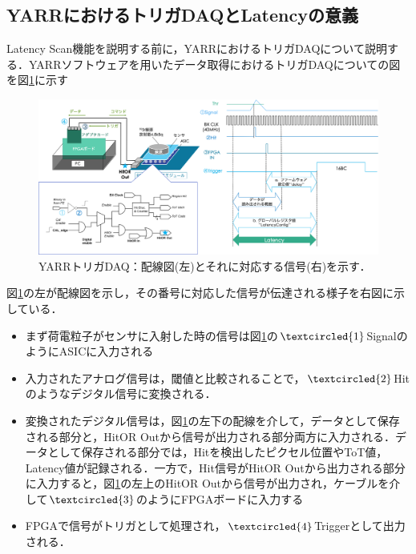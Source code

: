 \subsection{YARRにおけるトリガDAQとLatencyの意義}
Latency Scan機能を説明する前に，YARRにおけるトリガDAQについて説明する．YARRソフトウェアを用いたデータ取得におけるトリガDAQについての図を図\ref{fig:YARRDAQ}に示す\par
\begin{figure}[h]
  \centering
  \includegraphics[width=16cm]{./figure/DAQ_sigfig.png}
  \caption{YARRトリガDAQ：配線図(左)とそれに対応する信号(右)を示す．}
  \label{fig:YARRDAQ}
\end{figure}

図\ref{fig:YARRDAQ}の左が配線図を示し，その番号に対応した信号が伝達される様子を右図に示している．\par
\begin{itemize}  
\item まず荷電粒子がセンサに入射した時の信号は図\ref{fig:YARRDAQ}の$\textcircled{\scriptsize1}$SignalのようにASICに入力される
\item 入力されたアナログ信号は，閾値と比較されることで，$ \textcircled{\scriptsize2} $Hitのようなデジタル信号に変換される．
\item 変換されたデジタル信号は，図\ref{fig:YARRDAQ}の左下の配線を介して，データとして保存される部分と，HitOR Outから信号が出力される部分両方に入力される．データとして保存される部分では，Hitを検出したピクセル位置やToT値，Latency値が記録される．一方で，Hit信号がHitOR Outから出力される部分に入力すると，図\ref{fig:YARRDAQ}の左上のHitOR Outから信号が出力され，ケーブルを介して$ \textcircled{\scriptsize3} $のようにFPGAボードに入力する
\item FPGAで信号がトリガとして処理され，$ \textcircled{\scriptsize4} $Triggerとして出力される．
\end{itemize}

